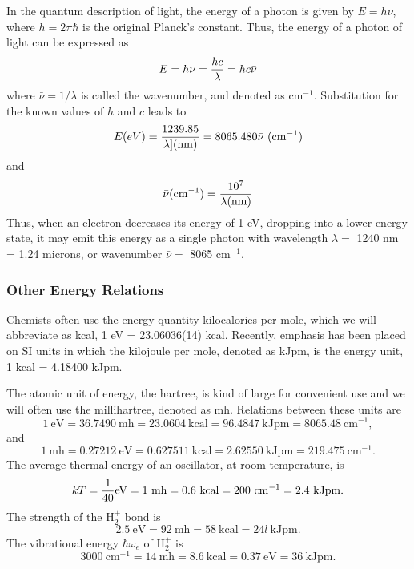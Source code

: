 In the quantum description of light, the energy of a photon is given
by $E = h \nu$, where $h = 2 \pi \hbar$ is the original Planck's
constant. Thus, the energy of a photon of light can be expressed as
\begin{equation}
E = h \nu = {hc \over \lambda} = hc {\bar \nu}
\end{equation}
where ${\bar \nu} = 1 / \lambda$ is called the wavenumber, and denoted 
as cm$^{-1}$. Substitution for the known values of $h$ and $c$ leads to
\begin{equation}
E(eV) = {1239.85 \over \lambda] (\mathrm{nm})} = 8065.480 {\bar \nu}\
(\mathrm{cm}^{-1})
\end{equation}
and
\begin{equation}
{\bar \nu} ( \mathrm{cm}^{-1}) = {10^7 \over \lambda (\mathrm{nm})}
\end{equation}
Thus, when an electron decreases its energy of 1 eV, dropping into a lower
energy state, it may emit this energy as a single photon with wavelength
$\lambda =$ 1240 nm = 1.24 microns, or wavenumber ${\bar \nu} =$ 
8065 cm$^{-1}$.

\subsubsection{Other Energy Relations}
    
Chemists often use the energy quantity kilocalories per mole, which we will
abbreviate as kcal, 1 eV = 23.06036(14) kcal. Recently, emphasis has been 
placed on SI units in which the kilojoule per mole, denoted as kJpm, is the 
energy unit, 1 kcal = 4.18400 kJpm.
    
The atomic unit of energy, the hartree, is kind of large for convenient use 
and we will often use the millihartree, denoted as mh. Relations between 
these units are
\begin{equation}
1\ \mathrm{eV} = 36.7490\ \mathrm{mh} 
  = 23.0604\ \mathrm{kcal} = 96.4847\ \mathrm{kJpm} 
  = 8065.48\ \mathrm{cm}^{-1},
\end{equation}
and
\begin{equation}
1\ \mathrm{mh} = 0.27212\ \mathrm{eV} = 0.627511\ \mathrm{kcal} 
   = 2.62550\ \mathrm{kJpm} = 219.475\ \mathrm{cm}^{-1}.
\end{equation}
The average thermal energy of an oscillator, at room temperature, is
\begin{equation}
kT = {1 \over 40}\mathrm{eV} = 1\ \mathrm{mh} = 0.6\ \mathrm{kcal} 
   = 200\ \mathrm{cm}^{-1} = 2.4\ \mathrm{kJpm}.
\end{equation}
The strength of the H$_2^+$ bond is
\begin{equation}
2.5\ \mathrm{eV} = 92\ \mathrm{mh} = 58\ \mathrm{kcal} = 24l\ \mathrm{kJpm}.
\end{equation}
The vibrational energy $\hbar \omega_e$ of H$_2^+$ is
\begin{equation}
3000\ \mathrm{cm}^{-1} = 14\ \mathrm{mh} = 8.6\ \mathrm{kcal} 
   = 0.37\ \mathrm{eV} = 36\ \mathrm{kJpm}.
\end{equation}

